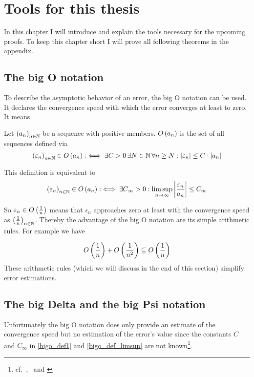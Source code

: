 \chapter{Tools for this thesis} \label{chapter:tools}

In this chapter I will introduce and explain the tools necessary for the upcoming proofs. To keep this chapter short I will prove all following theorems in the appendix.

\section{The big O notation}

To describe the asymptotic behavior of an error, the big O notation can be used. It declares the convergence speed with which the error converges at least to zero. It means~\cite[p.~444]{graham}\cite[p.~100]{aigner}

\begin{definition}
  Let $\left({a_n}\right)_{{n}\in\mathbb N}$ be a sequence with positive members. $O\left( {a_n} \right)$ is the set of all sequences defined via
  \begin{align} \label{bigo_def1}
    \left({\varepsilon_n}\right)_{{n}\in\mathbb N} \in O\left( {a_n} \right) :\iff \exists C > 0\, \exists N\in\mathbb N\,\forall n\ge N: \left|{\varepsilon_n}\right| \le C \cdot \left|{a_n}\right|
  \end{align}
\end{definition}

\noindent This definition is equivalent to~\cite[p.~383]{hachenberger}\cite{wiki:bigo}
\begin{align} \label{bigo_def_limsup}
  \left({\varepsilon_n}\right)_{{n}\in\mathbb N} \in O\left( {a_n} \right) :\iff \exists C_\infty > 0: \limsup_{n\to\infty} \left|{\frac{\varepsilon_n}{a_n}}\right| \le C_\infty
\end{align}

So $\varepsilon_n \in O\left( {\frac 1n} \right)$ means that $\epsilon_n$ approaches zero at least with the convergence speed as $\left({\frac 1n}\right)_{{n}\in\mathbb N}$. Thereby the advantage of the big O notation are its simple arithmetic rules. For example we have

\begin{align}
  O\left( {\frac 1n} \right) + O\left( {\frac 1{n^2}} \right) \subseteq O\left( {\frac 1n} \right)
\end{align}
These arithmetic rules (which we will discuss in the end of this section) simplify error estimations.

\section{The big Delta and the big Psi notation}
Unfortunately the big O notation does only provide an estimate of the convergence speed but no estimation of the error's value since the constants $C$ and $C_\infty$ in \eqref{bigo_def1} and \eqref{bigo_def_limsup} are not known\footnote{cf.~\cite[p.~444]{graham},~\cite{hurkyl_bigo} and \cite{templatetypedef_bigo}}.


